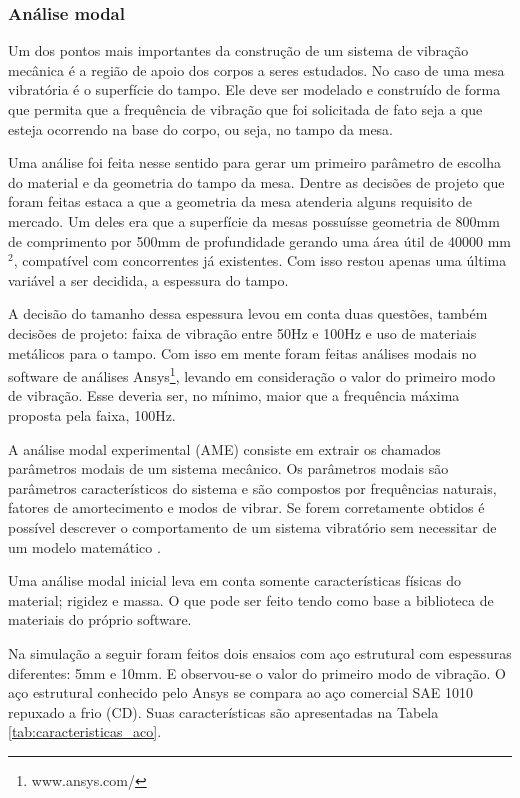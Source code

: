 \subsubsection*{\textbf{Análise modal}}

Um dos pontos mais importantes da construção de um sistema de vibração mecânica é a região de apoio dos corpos a seres estudados. No caso de uma mesa vibratória é o superfície do tampo. Ele deve ser modelado e construído de forma que permita que a frequência de vibração que foi solicitada de fato seja a que esteja ocorrendo na base do corpo, ou seja, no tampo da mesa.

  Uma análise foi feita nesse sentido para gerar um primeiro parâmetro de escolha do material e da geometria do tampo da mesa. Dentre as decisões de projeto que foram feitas estaca a que a geometria da mesa atenderia alguns requisito de mercado. Um deles era que a superfície da mesas possuísse geometria de 800mm de comprimento por 500mm de profundidade gerando uma área útil de 40000 mm$^2$, compatível com concorrentes já existentes. Com isso restou apenas uma última variável a ser decidida, a espessura do tampo.

  A decisão do tamanho dessa espessura levou em conta duas questões, também decisões de projeto: faixa de vibração entre 50Hz e 100Hz e uso de materiais metálicos para o tampo. Com isso em mente foram feitas análises modais no software de análises Ansys\footnote{www.ansys.com/}, levando em consideração o valor do primeiro modo de vibração. Esse deveria ser, no mínimo, maior que a frequência máxima proposta pela faixa, 100Hz.

  A análise modal experimental (AME) consiste em extrair os chamados parâmetros modais de um sistema mecânico. Os parâmetros modais são parâmetros característicos do sistema e são compostos por frequências naturais, fatores de amortecimento e modos de vibrar. Se forem corretamente obtidos é possível descrever o comportamento de um sistema vibratório sem necessitar de um modelo matemático \cite{evandro}.

  Uma análise modal inicial leva em conta somente características físicas do material; rigidez e massa. O que pode ser feito tendo como base a biblioteca de materiais do próprio software.

  Na simulação a seguir foram feitos dois ensaios com aço estrutural com espessuras diferentes: 5mm e 10mm. E observou-se o valor do primeiro modo de vibração. O aço estrutural conhecido pelo Ansys se compara ao aço comercial SAE 1010 repuxado a frio (CD). Suas características são apresentadas na Tabela \ref{tab:caracteristicas_aco}.

